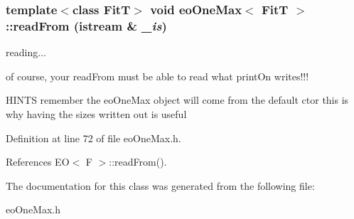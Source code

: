 \subsubsection{\setlength{\rightskip}{0pt plus 5cm}template$<$class Fit\-T$>$ void {\bf eo\-One\-Max}$<$ {\bf Fit\-T} $>$::read\-From (istream \& {\em \_\-is})\hspace{0.3cm}{\tt  [inline]}}\label{classeo_one_max_a4}


reading... 

of course, your read\-From must be able to read what print\-On writes!!!

HINTS remember the eo\-One\-Max object will come from the default ctor this is why having the sizes written out is useful 

Definition at line 72 of file eo\-One\-Max.h.

References EO$<$ F $>$::read\-From().

The documentation for this class was generated from the following file:\begin{CompactItemize}
\item 
eo\-One\-Max.h\end{CompactItemize}
